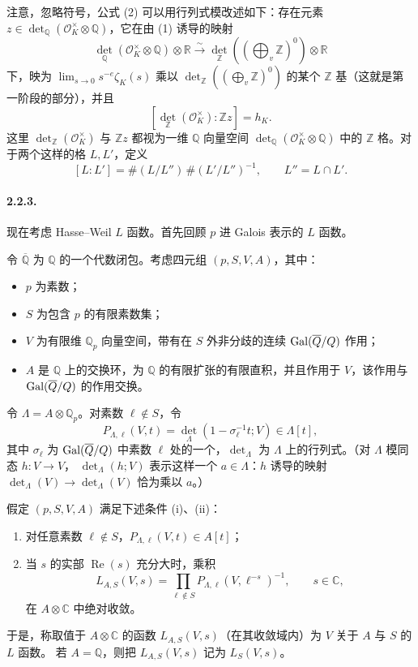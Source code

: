 注意，忽略符号，公式 (2) 可以用行列式模改述如下：存在元素
$z\in\det_{\mathbb Q}(\mathcal O_K^\times\otimes\mathbb Q)$，它在由 (1) 诱导的映射
\[
\det_{\mathbb Q}(\mathcal O_K^\times\otimes\mathbb Q)\otimes\mathbb R
\xrightarrow{\sim}
\det_{\mathbb Z}\left(\left(\bigoplus_v\mathbb Z\right)^0\right)\otimes\mathbb R
\]
下，映为 $\lim_{s\to0}s^{-e}\zeta_K(s)$ 乘以
$\det_{\mathbb Z}((\bigoplus_v\mathbb Z)^0)$ 的某个 $\mathbb Z$ 基（这就是第一阶段的部分），并且
\[
[\det_{\mathbb Z}(\mathcal O_K^\times):\mathbb Zz]=h_K.\tag{3}
\]
这里 $\det_{\mathbb Z}(\mathcal O_K^\times)$ 与 $\mathbb Zz$ 都视为一维 $\mathbb Q$ 向量空间
$\det_{\mathbb Q}(\mathcal O_K^\times\otimes\mathbb Q)$ 中的 $\mathbb Z$ 格。对于两个这样的格 $L,L'$，定义
\[
[L:L']=\#(L/L'')\,\#(L'/L'')^{-1},\qquad L''=L\cap L'.
\]

\paragraph{2.2.3.}
现在考虑 Hasse--Weil $L$ 函数。首先回顾 $p$ 进 Galois 表示的 $L$ 函数。

令 $\overline{\mathbb Q}$ 为 $\mathbb Q$ 的一个代数闭包。考虑四元组 $(p,S,V,A)$，其中：
\begin{itemize}
\item $p$ 为素数；
\item $S$ 为包含 $p$ 的有限素数集；
\end{itemize}
\begin{itemize}
\item $V$ 为有限维 $\mathbb Q_p$ 向量空间，带有在 $S$ 外非分歧的连续
$\operatorname{Gal}(\overline{Q}/Q)$ 作用；
\item $A$ 是 $\mathbb Q$ 上的交换环，为 $\mathbb Q$ 的有限扩张的有限直积，并且作用于 $V$，该作用与
$\operatorname{Gal}(\overline{Q}/Q)$ 的作用交换。
\end{itemize}
令 $\Lambda=A\otimes\mathbb Q_p$。对素数 $\ell\notin S$，令
\[
P_{\Lambda,\ell}(V,t)=\det_\Lambda(1-\sigma_\ell^{-1}t;V)\in\Lambda[t],
\]
其中 $\sigma_\ell$ 为 $\operatorname{Gal}(\overline{Q}/Q)$ 中素数 $\ell$ 处的一个，$\det_\Lambda$ 为 $\Lambda$ 上的行列式。（对 $\Lambda$ 模同态 $h\colon V\to V$，
$\det_\Lambda(h;V)$ 表示这样一个 $a\in\Lambda$：$h$ 诱导的映射
$\det_\Lambda(V)\to\det_\Lambda(V)$ 恰为乘以 $a$。）

假定 $(p,S,V,A)$ 满足下述条件 (i)、(ii)：
\begin{enumerate}[label=(\roman*)]
\item 对任意素数 $\ell\notin S$，$P_{\Lambda,\ell}(V,t)\in A[t]$；
\item 当 $s$ 的实部 $\operatorname{Re}(s)$ 充分大时，乘积
\[
L_{A,S}(V,s)=\prod_{\ell\notin S}P_{\Lambda,\ell}(V,\ell^{-s})^{-1},
\qquad s\in\mathbb C,
\]
在 $A\otimes\mathbb C$ 中绝对收敛。
\end{enumerate}
于是，称取值于 $A\otimes\mathbb C$ 的函数 $L_{A,S}(V,s)$（在其收敛域内）为 $V$ 关于 $A$ 与 $S$ 的 $L$ 函数。
若 $A=\mathbb Q$，则把 $L_{A,S}(V,s)$ 记为 $L_S(V,s)$。


